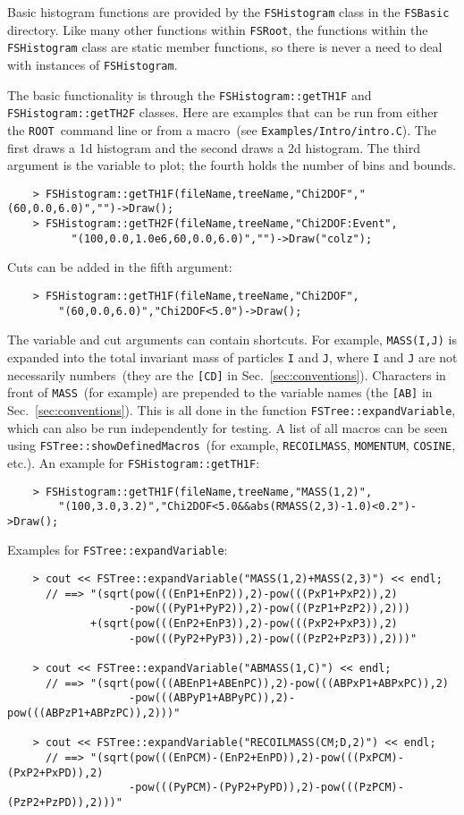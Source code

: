 \documentclass[11pt]{article}
\newcommand{\FSR}{{\tt FSRoot}}
\newcommand{\ROOT}{{\tt ROOT}}
\begin{document}
Basic histogram functions are provided by the {\tt FSHistogram} class in the {\tt FSBasic} directory.  Like many other functions within \FSR, the functions within the {\tt FSHistogram} class are static member functions, so there is never a need to deal with instances of {\tt FSHistogram}.

The basic functionality is through the {\tt FSHistogram::getTH1F} and {\tt FSHistogram::getTH2F} classes.  Here are examples that can be run from either the \ROOT\ command line or from a macro~(see {\tt Examples/Intro/intro.C}).  The first draws a 1d histogram and the second draws a 2d histogram.  The third argument is the variable to plot; the fourth holds the number of bins and bounds.
\begin{verbatim}
    > FSHistogram::getTH1F(fileName,treeName,"Chi2DOF","(60,0.0,6.0)","")->Draw();
    > FSHistogram::getTH2F(fileName,treeName,"Chi2DOF:Event",
          "(100,0.0,1.0e6,60,0.0,6.0)","")->Draw("colz");
\end{verbatim}
Cuts can be added in the fifth argument:
\begin{verbatim}
    > FSHistogram::getTH1F(fileName,treeName,"Chi2DOF",
        "(60,0.0,6.0)","Chi2DOF<5.0")->Draw();
\end{verbatim}
The variable and cut arguments can contain shortcuts.  For example, {\tt MASS(I,J)} is expanded into the total invariant mass of particles {\tt I} and {\tt J}, where {\tt I} and {\tt J} are not necessarily numbers~(they are the {\tt [CD]} in Sec.~\ref{sec:conventions}).  Characters in front of {\tt MASS}~(for example) are prepended to the variable names (the {\tt [AB]} in Sec.~\ref{sec:conventions}).  This is all done in the function {\tt FSTree::expandVariable}, which can also be run independently for testing.  
A list of all macros can be seen using {\tt FSTree::showDefinedMacros}~(for example, {\tt RECOILMASS}, {\tt MOMENTUM}, {\tt COSINE}, etc.).  An example for {\tt FSHistogram::getTH1F}:
\begin{verbatim}
    > FSHistogram::getTH1F(fileName,treeName,"MASS(1,2)",
        "(100,3.0,3.2)","Chi2DOF<5.0&&abs(RMASS(2,3)-1.0)<0.2")->Draw();
\end{verbatim}
Examples for {\tt FSTree::expandVariable}:
\begin{verbatim}
    > cout << FSTree::expandVariable("MASS(1,2)+MASS(2,3)") << endl;
      // ==> "(sqrt(pow(((EnP1+EnP2)),2)-pow(((PxP1+PxP2)),2)
                   -pow(((PyP1+PyP2)),2)-pow(((PzP1+PzP2)),2)))
             +(sqrt(pow(((EnP2+EnP3)),2)-pow(((PxP2+PxP3)),2)
                   -pow(((PyP2+PyP3)),2)-pow(((PzP2+PzP3)),2)))"

    > cout << FSTree::expandVariable("ABMASS(1,C)") << endl;
      // ==> "(sqrt(pow(((ABEnP1+ABEnPC)),2)-pow(((ABPxP1+ABPxPC)),2)
                   -pow(((ABPyP1+ABPyPC)),2)-pow(((ABPzP1+ABPzPC)),2)))"

    > cout << FSTree::expandVariable("RECOILMASS(CM;D,2)") << endl;
      // ==> "(sqrt(pow(((EnPCM)-(EnP2+EnPD)),2)-pow(((PxPCM)-(PxP2+PxPD)),2)
                   -pow(((PyPCM)-(PyP2+PyPD)),2)-pow(((PzPCM)-(PzP2+PzPD)),2)))"
\end{verbatim}
\end{document}

